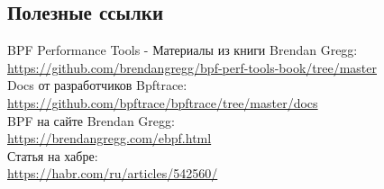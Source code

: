 \subsection{Полезные ссылки}

\noindent BPF Performance Tools - Материалы из книги Brendan Gregg: \\
\indent \url{https://github.com/brendangregg/bpf-perf-tools-book/tree/master} \\

\noindent Docs от разработчиков Bpftrace: \\
\indent \url{https://github.com/bpftrace/bpftrace/tree/master/docs} \\

\noindent BPF на сайте Brendan Gregg: \\
\indent \url{https://brendangregg.com/ebpf.html} \\

\noindent Статья на хабре: \\
\indent \url{https://habr.com/ru/articles/542560/}
